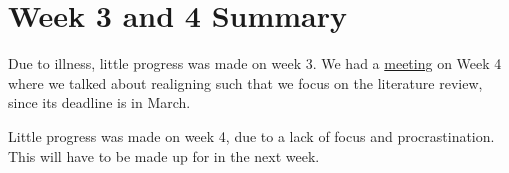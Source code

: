 \documentclass{article}
\begin{document}
\section*{Week 3 and 4 Summary}

\vspace{0.5cm}

Due to illness, little progress was made on week 3. We had a \href{https://github.com/rowan-adeya/masters-project/issues/4}{meeting} on Week 4 where we talked about realigning such that we focus on the literature review, since its deadline is in March. 

Little progress was made on week 4, due to a lack of focus and procrastination. This will have to be made up for in the next week. 
\end{document}
